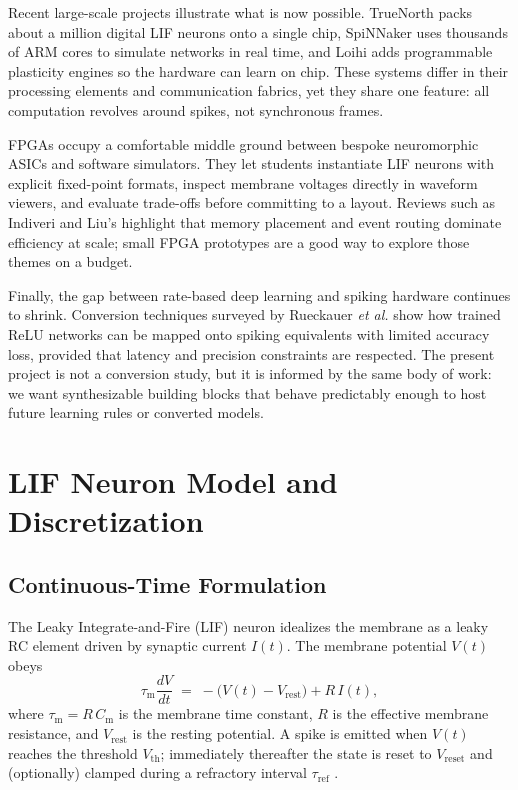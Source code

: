 \documentclass[10pt,onecolumn]{IEEEtran}
\newcommand{\Vrest}{V_{\mathrm{rest}}}
\newcommand{\Vreset}{V_{\mathrm{reset}}}
\newcommand{\Vth}{V_{\mathrm{th}}}
\newcommand{\taum}{\tau_{\mathrm{m}}}
\newcommand{\tref}{\tau_{\mathrm{ref}}}
\begin{document}
Recent large-scale projects illustrate what is now possible. TrueNorth \cite{Merolla2014} packs about a million digital LIF neurons onto a single chip, SpiNNaker \cite{Furber2014} uses thousands of ARM cores to simulate networks in real time, and Loihi \cite{Davies2018} adds programmable plasticity engines so the hardware can learn on chip. These systems differ in their processing elements and communication fabrics, yet they share one feature: all computation revolves around spikes, not synchronous frames.

FPGAs occupy a comfortable middle ground between bespoke neuromorphic ASICs and software simulators. They let students instantiate LIF neurons with explicit fixed-point formats, inspect membrane voltages directly in waveform viewers, and evaluate trade-offs before committing to a layout. Reviews such as Indiveri and Liu’s \cite{IndiveriLiu2015} highlight that memory placement and event routing dominate efficiency at scale; small FPGA prototypes are a good way to explore those themes on a budget.

Finally, the gap between rate-based deep learning and spiking hardware continues to shrink. Conversion techniques surveyed by Rueckauer \emph{et al.} \cite{Rueckauer2017} show how trained ReLU networks can be mapped onto spiking equivalents with limited accuracy loss, provided that latency and precision constraints are respected. The present project is not a conversion study, but it is informed by the same body of work: we want synthesizable building blocks that behave predictably enough to host future learning rules or converted models.

\section{LIF Neuron Model and Discretization}
\label{sec:lif-model}

\subsection*{Continuous-Time Formulation}
The Leaky Integrate-and-Fire (LIF) neuron idealizes the membrane as a leaky RC element driven by synaptic current \(I(t)\). The membrane potential \(V(t)\) obeys
\begin{equation}
\taum \frac{dV}{dt} \;=\; -\bigl(V(t)-\Vrest\bigr) + R\,I(t),
\label{eq:lif_ct}
\end{equation}
where \(\taum = R\,C_{\mathrm{m}}\) is the membrane time constant, \(R\) is the effective membrane resistance, and \(\Vrest\) is the resting potential. A spike is emitted when \(V(t)\) reaches the threshold \(\Vth\); immediately thereafter the state is reset to \(\Vreset\) and (optionally) clamped during a refractory interval \(\tref\) \cite{GerstnerKistler2002,Maass1997,Izhikevich2003,IndiveriLiu2015}.
\end{document}
